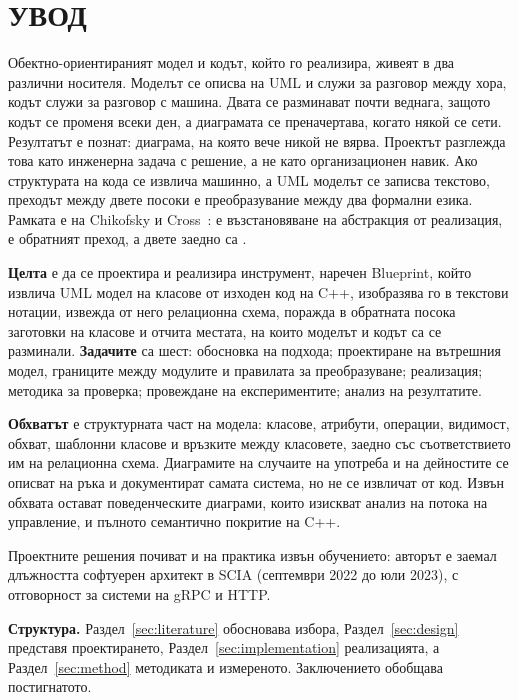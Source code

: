 \section*{УВОД}
\label{sec:introduction}

Обектно-ориентираният модел и кодът, който го реализира, живеят в два различни носителя.
Моделът се описва на UML и служи за разговор между хора, кодът служи за разговор с машина.
Двата се разминават почти веднага, защото кодът се променя всеки ден, а диаграмата се
преначертава, когато някой се сети. Резултатът е познат: диаграма, на която вече никой не
вярва. Проектът разглежда това като инженерна задача с решение, а не като организационен навик.
Ако структурата на кода се извлича машинно, а UML моделът се записва текстово, преходът между
двете посоки е преобразувание между два формални езика. Рамката е на Chikofsky и
Cross~\cite{chikofsky1990reverse}:  е възстановяване на абстракция от
реализация,  е обратният преход, а двете заедно са .

\textbf{Целта} е да се проектира и реализира инструмент, наречен Blueprint, който извлича UML
модел на класове от изходен код на C++, изобразява го в текстови нотации, извежда от него
релационна схема, поражда в обратната посока заготовки на класове и отчита местата, на които
моделът и кодът са се разминали. \textbf{Задачите} са шест: обосновка на подхода; проектиране на
вътрешния модел, границите между модулите и правилата за преобразуване; реализация;
методика за проверка; провеждане на експериментите; анализ на резултатите.

\textbf{Обхватът} е структурната част на модела: класове, атрибути, операции, видимост, обхват,
шаблонни класове и връзките между класовете, заедно със съответствието им на релационна схема.
Диаграмите на случаите на употреба и на дейностите се описват на ръка и документират самата
система, но не се извличат от код. Извън обхвата остават поведенческите диаграми, които изискват
анализ на потока на управление, и пълното семантично покритие на C++.

Проектните решения почиват и на практика извън обучението: авторът е заемал длъжността софтуерен
архитект в SCIA (септември 2022 до юли 2023), с отговорност за системи на gRPC и HTTP.

\textbf{Структура.} Раздел~\ref{sec:literature} обосновава избора, Раздел~\ref{sec:design}
представя проектирането, Раздел~\ref{sec:implementation} реализацията, а
Раздел~\ref{sec:method} методиката и измереното. Заключението обобщава постигнатото.
